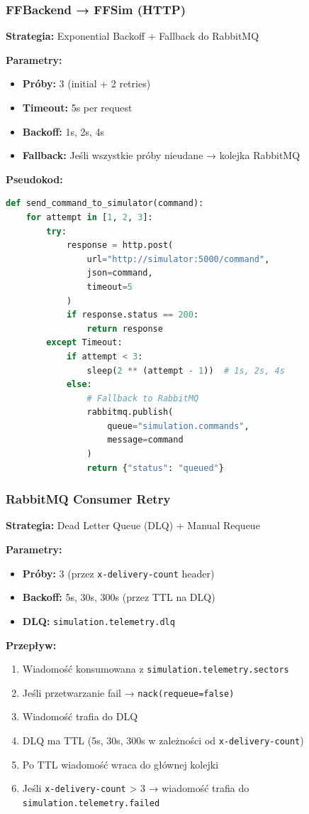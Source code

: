 \subsubsection{FFBackend → FFSim (HTTP)}

\textbf{Strategia:} Exponential Backoff + Fallback do RabbitMQ

\textbf{Parametry:}
\begin{itemize}
    \item \textbf{Próby:} 3 (initial + 2 retries)
    \item \textbf{Timeout:} 5s per request
    \item \textbf{Backoff:} 1s, 2s, 4s
    \item \textbf{Fallback:} Jeśli wszystkie próby nieudane → kolejka RabbitMQ
\end{itemize}

\textbf{Pseudokod:}
\begin{lstlisting}[language=Python]
def send_command_to_simulator(command):
    for attempt in [1, 2, 3]:
        try:
            response = http.post(
                url="http://simulator:5000/command",
                json=command,
                timeout=5
            )
            if response.status == 200:
                return response
        except Timeout:
            if attempt < 3:
                sleep(2 ** (attempt - 1))  # 1s, 2s, 4s
            else:
                # Fallback to RabbitMQ
                rabbitmq.publish(
                    queue="simulation.commands",
                    message=command
                )
                return {"status": "queued"}
\end{lstlisting}

\subsubsection{RabbitMQ Consumer Retry}

\textbf{Strategia:} Dead Letter Queue (DLQ) + Manual Requeue

\textbf{Parametry:}
\begin{itemize}
    \item \textbf{Próby:} 3 (przez \texttt{x-delivery-count} header)
    \item \textbf{Backoff:} 5s, 30s, 300s (przez TTL na DLQ)
    \item \textbf{DLQ:} \texttt{simulation.telemetry.dlq}
\end{itemize}

\textbf{Przepływ:}
\begin{enumerate}
    \item Wiadomość konsumowana z \texttt{simulation.telemetry.sectors}
    \item Jeśli przetwarzanie fail → \texttt{nack(requeue=false)}
    \item Wiadomość trafia do DLQ
    \item DLQ ma TTL (5s, 30s, 300s w zależności od \texttt{x-delivery-count})
    \item Po TTL wiadomość wraca do głównej kolejki
    \item Jeśli \texttt{x-delivery-count} > 3 → wiadomość trafia do \texttt{simulation.telemetry.failed}
\end{enumerate}

